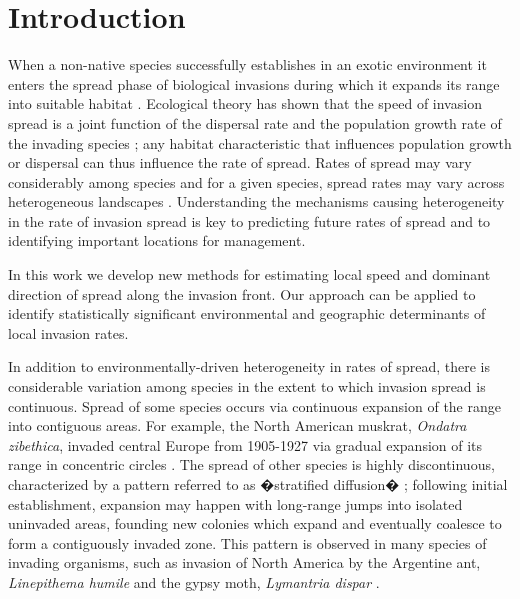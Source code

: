 \documentclass[12pt]{article}
\begin{document}
\clearpage

\section{Introduction}\label{sec:intro}

When a non-native species successfully establishes in an exotic environment it enters the spread phase of biological invasions during which it expands its range into suitable habitat \citep{lockwood2013invasion}. Ecological theory has shown that the speed of invasion spread is a joint function of the dispersal rate and the population growth rate of the invading species \citep{skellam1951random,okubo1980diffusion}; any habitat characteristic that influences population growth or dispersal can thus influence the rate of spread. Rates of spread may vary considerably among species and for a given species, spread rates may vary across heterogeneous landscapes \citep{shigesada1987speeds, tobin2007invasion}. Understanding the mechanisms causing heterogeneity in the rate of invasion spread is key to predicting future rates of spread and to identifying important locations for management.

In this work we develop new methods for estimating local speed and dominant direction of spread along the invasion front. Our approach can be applied to identify statistically significant environmental and geographic determinants of local invasion rates.

In addition to environmentally-driven heterogeneity in rates of spread, there is considerable variation among species in the extent to which invasion spread is continuous. Spread of some species occurs via continuous expansion of the range into contiguous areas. For example, the North American muskrat, {\it Ondatra zibethica}, invaded central Europe from 1905-1927 via gradual expansion of its range in concentric circles \citep{skellam1951random}.  The spread of other species is highly discontinuous, characterized by a pattern referred to as �stratified diffusion� \citep{shigesada1995}; following initial establishment, expansion may happen with long-range jumps into isolated uninvaded areas, founding new colonies which expand and eventually coalesce to form a contiguously invaded zone. This pattern is observed in many species of invading organisms, such as invasion of North America by the Argentine ant, {\it Linepithema humile} \citep{suarez2001patterns} and the gypsy moth, {\it Lymantria dispar} \citep{sharov2002slow}.
\end{document}
